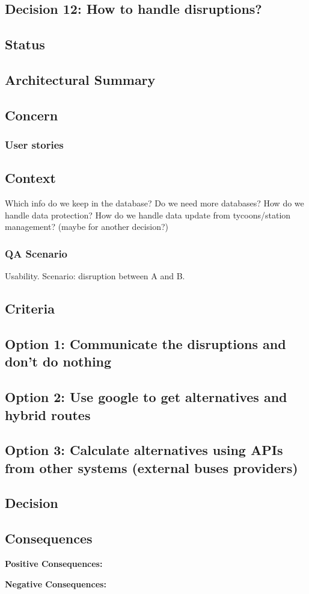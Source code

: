 \subsection{Decision 12: How to handle disruptions?}

\subsection*{Status}

\subsection*{Architectural Summary}


\subsection*{Concern}
\subsubsection*{User stories}

\subsection*{Context}
Which info do we keep in the database? 
Do we need more databases?
How do we handle data protection?
How do we handle data update from tycoons/station management? (maybe for another decision?)

\subsubsection*{QA Scenario} %
Usability.
Scenario: disruption between A and B.
\subsection*{Criteria}
\begin{itemize}
\end{itemize}

\subsection*{Option 1: Communicate the disruptions and don't do nothing}
\subsection*{Option 2: Use google to get alternatives and hybrid routes}
\subsection*{Option 3: Calculate alternatives using APIs from other systems (external buses providers)}


\subsection*{Decision}

\subsection*{Consequences}
\textbf{Positive Consequences:}
\begin{itemize}
\end{itemize}
\textbf{Negative Consequences:}
\begin{itemize}
\end{itemize}

